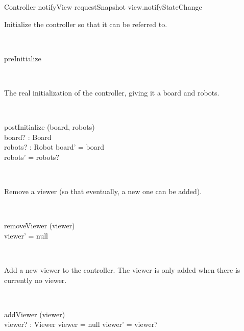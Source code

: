 \documentclass[12pt]{article}
\begin{document}
\begin{class}{Controller}
notifyView \sdef requestSnapshot \comp view.notifyStateChange
\znewpage
\begin{zpar}
Initialize the controller so that it can be referred to.
\end{zpar} \\
\begin{schema}{preInitialize}
\end{schema}\\
\begin{zpar}
The real initialization of the controller, giving it a board and robots.
\end{zpar} \\
\begin{schema}{postInitialize}
\Delta (board, robots) \\
board? : Board \\
robots? : \power Robot
\where
board' = board \\
robots' = robots?
\end{schema}\\
\begin{zpar}
Remove a viewer (so that eventually, a new one can be added).
\end{zpar} \\
\begin{schema}{removeViewer}
\Delta(viewer) \\
\where
viewer' = null
\end{schema}\\
\begin{zpar}
Add a new viewer to the controller. The viewer is only added when there is currently no viewer.
\end{zpar} \\
\begin{schema}{addViewer}
\Delta(viewer) \\
viewer? : Viewer
\where
viewer = null \Rightarrow viewer' = viewer?
\end{schema}
\end{class}
\end{document}
